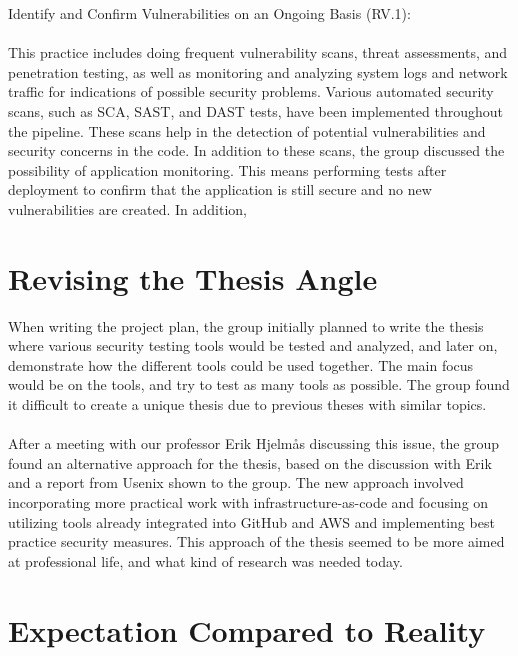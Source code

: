 Identify and Confirm Vulnerabilities on an Ongoing Basis (RV.1): \cite{ssdf}
\\~\\This practice includes doing frequent vulnerability scans, threat assessments, and penetration testing, as well as monitoring and analyzing system logs and network traffic for indications of possible security problems. Various automated security scans, such as SCA, SAST, and DAST tests, have been implemented throughout the pipeline. These scans help in the detection of potential vulnerabilities and security concerns in the code. In addition to these scans, the group discussed the possibility of application monitoring. This means performing tests after deployment to confirm that the application is still secure and no new vulnerabilities are created. In addition, 

\section{Revising the Thesis Angle}
When writing the project plan, the group initially planned to write the thesis where various security testing tools would be tested and analyzed, and later on, demonstrate how the different tools could be used together. The main focus would be on the tools, and try to test as many tools as possible. The group found it difficult to create a unique thesis due to previous theses with similar topics. 
\\~\\
After a meeting with our professor Erik Hjelmås discussing this issue, the group found an alternative approach for the thesis, based on the discussion with Erik and a report from Usenix \cite{usenixreport} shown to the group. The new approach involved incorporating more practical work with infrastructure-as-code and focusing on utilizing tools already integrated into GitHub and AWS and implementing best practice security measures. This approach of the thesis seemed to be more aimed at professional life, and what kind of research was needed today.  


\section{Expectation Compared to Reality}
